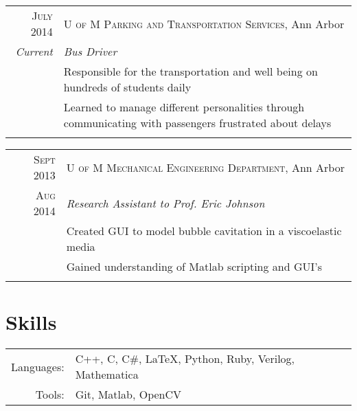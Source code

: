 \documentclass[a4paper,10pt]{article} %
\begin{document}
\begin{tabular}{r|p{13cm}}
\textsc{July 2014} & \textsc{U of M Parking and Transportation Services}, Ann Arbor \\
\emph{Current} & \emph{Bus Driver} \\
& \footnotesize{Responsible for the transportation and well being on hundreds of students daily} \\
& \footnotesize{Learned to manage different personalities through communicating
  with passengers frustrated about delays} \\
\multicolumn{2}{c}{} \\
\end{tabular}


\begin{tabular}{r|p{13cm}}
\textsc{Sept 2013} & \textsc{U of M Mechanical Engineering Department}, Ann Arbor \\
\textsc{Aug 2014} & \emph{Research Assistant to Prof. Eric Johnson} \\
& \footnotesize{Created GUI to model bubble cavitation in a viscoelastic media} \\
& \footnotesize{Gained understanding of Matlab scripting and GUI's} \\
\multicolumn{2}{c}{} \\
\end{tabular}



\section{Skills}

\begin{tabular}{rl}
Languages: & C++, C, C\#, \LaTeX, Python, Ruby, Verilog, Mathematica \\
Tools: & Git, Matlab, OpenCV
\end{tabular}

\clearpage %
\end{document}
